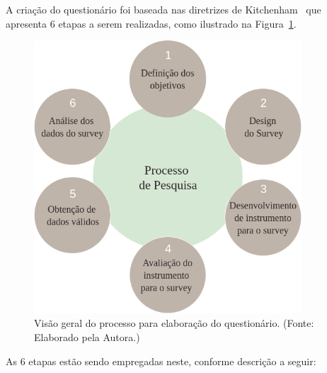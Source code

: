 A criação do questionário foi baseada nas  diretrizes de Kitchenham~\cite{kitchenham2008personal} que apresenta 6 etapas a serem realizadas, como ilustrado na Figura~\ref{fig:Abordagem}.

        \begin{figure}[h]
          \centering
          \includegraphics[width=10cm]{figuras/survey.png}
          \caption{Visão geral do processo para elaboração do questionário.  (Fonte: Elaborado pela Autora.)} 
          \label{fig:Abordagem}
        
        \end{figure}
 
 As 6 etapas estão sendo empregadas neste, conforme descrição a seguir:
 

